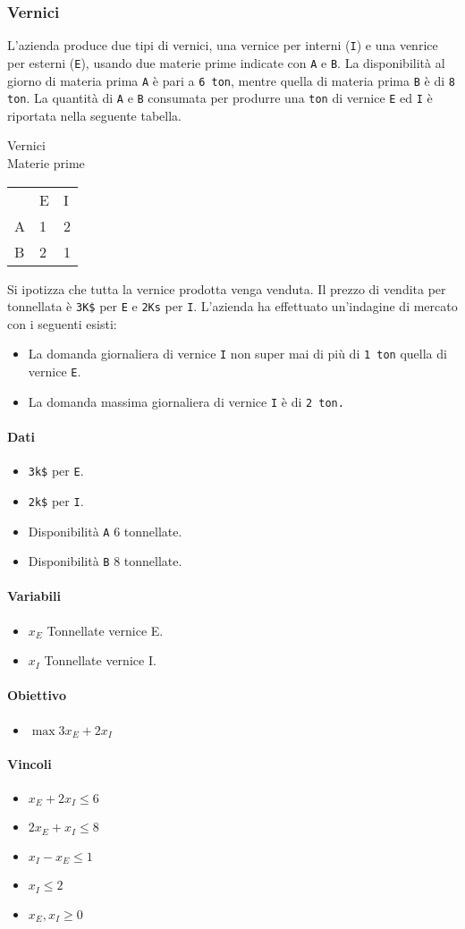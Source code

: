 \documentclass[12pt, twoside, letterpaper]{article}
\newcommand{\problema}[5]{
	#1
	\begin{dati}
		\paragraph{Dati} #2
	\end{dati}
	\begin{variabili}
		\paragraph{Variabili} #3
	\end{variabili}
	\begin{obiettivo}
		\paragraph{Obiettivo} #4
	\end{obiettivo}
	\begin{vincoli}
		\paragraph{Vincoli} #5
	\end{vincoli}
}
\begin{document}
			\subsubsection{Vernici}
				\problema
					{L'azienda produce due tipi di vernici, una vernice per interni (\texttt{I}) e una venrice per esterni (\texttt{E}), usando due materie prime indicate con \texttt{A} e \texttt{B}. La disponibilità al giorno di materia prima \texttt{A} è pari a \texttt{6 ton}, mentre quella di materia prima \texttt{B} è di \texttt{8 ton}. La quantità di \texttt{A} e \texttt{B} consumata per produrre una \texttt{ton} di vernice \texttt{E} ed \texttt{I} è riportata nella seguente tabella.
											
											\quad\qquad\qquad\qquad Vernici\\
						Materie prime
						\begin{tabular}{lll}
								& E & I \\
							A 	& 1	& 2 \\
							B	& 2	& 1
						\end{tabular}
						
					Si ipotizza che tutta la vernice prodotta venga venduta. Il prezzo di vendita per tonnellata è \texttt{3K\$} per \texttt{E} e \texttt{2Ks} per \texttt{I}. L'azienda ha effettuato un'indagine di mercato con i seguenti esisti: 
					\begin{itemize}
						\item La domanda giornaliera di vernice \texttt{I} non super mai di più di \texttt{1 ton} quella di vernice \texttt{E}.
						\item La domanda massima giornaliera di vernice \texttt{I} è di \texttt{2 ton.}
					\end{itemize}
					}
					{\begin{itemize}
						\item \texttt{3k\$} per \texttt{E}.
						\item \texttt{2k\$} per \texttt{I}.
						\item Disponibilità \texttt{A} 6 tonnellate.
						\item Disponibilità \texttt{B} 8 tonnellate.
					\end{itemize}}
					{\begin{itemize}
						\item $x_E$ Tonnellate vernice E.
						\item $x_I$ Tonnellate vernice I.
					\end{itemize}}
					{\begin{itemize}
						\item $\max 3x_E + 2x_I$
					\end{itemize}}
					{\begin{itemize}
						\item $x_E + 2x_I \leq 6$
						\item $2x_E + x_I \leq 8$
						\item $x_I - x_E \leq 1$
						\item $x_I \leq 2$
						\item $x_E, x_I \geq 0 $
					\end{itemize}}
\end{document}
